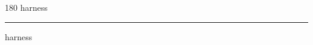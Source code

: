 
\begin{frame}
\begin{center}
\begin{turn}{180}
{\fontsize{2.5cm}{1em}\selectfont harness}
\end{turn}
\vspace{1em}\par  
\hrule
\vspace{1em}\par  
{\fontsize{2.5cm}{1em}\selectfont harness}
\end{center}
\end{frame}
